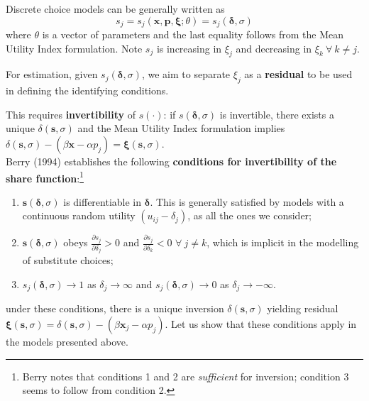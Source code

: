 \documentclass[11pt]{article}
\begin{document}
Discrete choice models can be generally written as
\begin{equation*}
	s_j = s_j(\bm{x, p , \xi}; \theta) =  s_j(\bm{\delta}, \sigma)
\end{equation*}
where $\theta$ is a vector of parameters and the last equality follows from the Mean Utility Index formulation.
Note $s_j$ is increasing in $\xi_j$ and decreasing in $\xi_k ~\forall~ k \neq j$.

For estimation, given $s_j(\bm{\delta}, \sigma)$, we aim to separate $\xi_j$ as a \textbf{residual} to be used in defining the identifying conditions.

This requires \textbf{invertibility} of $s(\cdot)$: if $s(\bm{\delta}, \sigma)$ is invertible, there exists a unique $\delta(\bm{s}, \sigma)$ and the Mean Utility Index formulation implies $ \delta(\bm{s}, \sigma) - (\beta \bm{x} - \alpha p_j) = \bm{\xi}(\bm{s}, \sigma)$. \\

Berry (1994) establishes the following \textbf{conditions for invertibility of the share function}:\footnote{Berry notes that conditions 1 and 2 are \textit{sufficient} for inversion; condition 3 seems to follow from condition 2.}
\begin{enumerate}
	\item $\bm{s}(\bm{\delta}, \sigma)$ is differentiable in $\bm{\delta}$. This is generally satisfied by models with a continuous random utility $(u_{ij} - \delta_j)$, as all the ones we consider;
	\item $\bm{s}(\bm{\delta}, \sigma)$ obeys $\frac{\partial s_j}{\partial \delta_j} > 0$ and $\frac{\partial s_j}{\partial \delta_k} < 0$ $\forall ~ j \neq k$, which is implicit in the modelling of substitute choices;
	\item $s_j(\bm{\delta}, \sigma) \rightarrow 1$ as $\delta_j \rightarrow \infty$ and $s_j(\bm{\delta}, \sigma) \rightarrow 0$ as $\delta_j \rightarrow - \infty$.
\end{enumerate}

under these conditions, there is a unique inversion $\delta(\bm{s}, \sigma)$ yielding residual $\bm{\xi}(\bm{s}, \sigma) = \delta(\bm{s}, \sigma) - (\beta \bm{x}_j - \alpha p_j)$. Let us show that these conditions apply in the models presented above.
\end{document}
